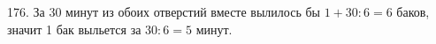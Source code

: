176. За 30 минут из обоих отверстий вместе вылилось бы $1+30:6=6$ баков, значит 1 бак выльется за $30:6=5$ минут.\\
